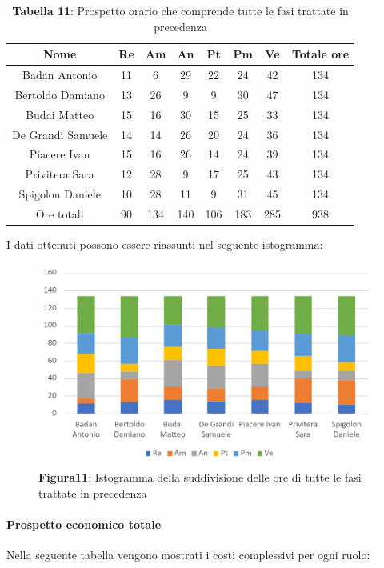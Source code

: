 \begin{table}[H]
	\centering
	\renewcommand{\arraystretch}{1.5}
	\begin{tabular}{|c|c|c|c|c|c|c|c|}
		\hline
		\rowcolor{lighter-grayer}
		Nome & Re & Am & An & Pt & Pm & Ve & Totale ore\\
		\hline
		Badan Antonio & 11 & 6 & 29 & 22 & 24 & 42 & 134 \\
		\hline
		Bertoldo Damiano & 13 & 26 & 9 & 9 & 30 & 47 & 134 \\
		\hline
		Budai Matteo & 15 & 16 & 30 & 15 & 25 & 33 & 134 \\
		\hline
		De Grandi Samuele & 14 & 14 & 26 & 20 & 24 & 36 & 134 \\
		\hline
		Piacere Ivan & 15 & 16 & 26 & 14 & 24 & 39 & 134 \\
		\hline
		Privitera Sara & 12 & 28 & 9 & 17 & 25 & 43 & 134 \\
		\hline
		Spigolon Daniele & 10 & 28 & 11 & 9 & 31 & 45 & 134 \\
		\hline
		Ore totali & 90 & 134 & 140 & 106 & 183 & 285 & 938 \\
		\hline
	\end{tabular}
	\caption*{\textbf{Tabella 11}: Prospetto orario che comprende tutte le fasi trattate in precedenza\\}
\end{table}	
I dati ottenuti possono essere riassunti nel seguente istogramma:

\begin{figure}[H]
	\centering
	\includegraphics[width=0.7\linewidth]{res/images/IstogrammaTotale.png}
	\caption*{\textbf{Figura11}: Istogramma della suddivisione delle ore di tutte le fasi trattate in precedenza}
	\label{fig:Figura10}
\end{figure}

\paragraph{Prospetto economico totale}
Nella seguente tabella vengono mostrati i costi complessivi per ogni ruolo:

